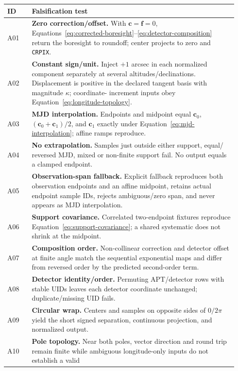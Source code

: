 \documentclass[11pt]{article}
\begin{document}
\begin{longtable}{>{\raggedright\arraybackslash}p{0.10\linewidth}
                  >{\raggedright\arraybackslash}p{0.84\linewidth}}
\toprule
ID & Falsification test \\
\midrule
\endhead
A01 & \textbf{Zero correction/offset.} With $\boldsymbol c=\boldsymbol f=0$,
Equations~\eqref{eq:corrected-boresight}--\eqref{eq:detector-composition}
return the boresight to roundoff; center projects to zero and \texttt{CRPIX}.
\\
A02 & \textbf{Constant sign/unit.} Inject $+1$ arcsec in each normalized
component separately at several altitudes/declinations.  Displacement is
positive in the declared tangent basis with magnitude $\kappa$; coordinate-
increment inputs obey Equation~\eqref{eq:longitude-topology}. \\
A03 & \textbf{MJD interpolation.} Endpoints and midpoint equal
$\boldsymbol c_0$, $(\boldsymbol c_0+\boldsymbol c_1)/2$, and
$\boldsymbol c_1$ exactly under Equation~\eqref{eq:mjd-interpolation}; affine
ramps reproduce. \\
A04 & \textbf{No extrapolation.} Samples just outside either support, equal/
reversed MJD, mixed or non-finite support fail.  No output equals a clamped
endpoint. \\
A05 & \textbf{Observation-span fallback.} Explicit fallback reproduces both
observation endpoints and an affine midpoint, retains actual endpoint sample
IDs, rejects ambiguous/zero span, and never appears as MJD interpolation. \\
A06 & \textbf{Support covariance.} Correlated two-endpoint fixtures reproduce
Equation~\eqref{eq:support-covariance}; a shared systematic does not shrink at
the midpoint. \\
A07 & \textbf{Composition order.} Non-collinear correction and detector offset
at finite angle match the sequential exponential maps and differ from reversed
order by the predicted second-order term. \\
A08 & \textbf{Detector identity/order.} Permuting APT/detector rows with stable
UIDs leaves each detector coordinate unchanged; duplicate/missing UID fails.
\\
A09 & \textbf{Circular wrap.} Centers and samples on opposite sides of
$0/2\pi$ yield the short signed separation, continuous projection, and
normalized output. \\
A10 & \textbf{Pole topology.} Near both poles, vector direction and round trip
remain finite while ambiguous longitude-only inputs do not establish a valid

\end{longtable}
\end{document}
